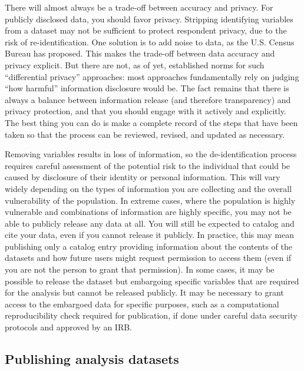 There will almost always be a trade-off between accuracy and privacy.
For publicly disclosed data, you should favor privacy.
Stripping identifying variables from a dataset may not be sufficient to protect respondent privacy,
due to the risk of re-identification.
One solution is to add noise to data, as the U.S. Census Bureau has proposed.
This makes the trade-off between data accuracy and privacy explicit.
But there are not, as of yet, established norms for such ``differential privacy'' approaches:
most approaches fundamentally rely on judging ``how harmful'' information disclosure would be.
The fact remains that there is always a balance between information release (and therefore transparency)
and privacy protection, and that you should engage with it actively and explicitly.
The best thing you can do is make a complete record of the steps that have been taken
so that the process can be reviewed, revised, and updated as necessary.

Removing variables results in loss of information, so the de-identification process
requires careful assessment of the potential risk to the individual
that could be caused by disclosure of their identity or personal information.
This will vary widely depending on the types of information
you are collecting and the overall vulnerability of the population.
In extreme cases, where the population is highly vulnerable
and combinations of information are highly specific,
you may not be able to publicly release any data at all.
You will still be expected to catalog and cite your data,
even if you cannot release it publicly.
In practice, this may mean publishing only a catalog entry
providing information about the contents of the datasets
and how future users might request permission to access them
(even if you are not the person to grant that permission).
In some cases, it may be possible to release the dataset but
embargoing specific variables that are required for the analysis but cannot be released publicly.
It may be necessary to grant access to the embargoed data for specific purposes,
such as a computational reproducibility check required for publication,
if done under careful data security protocols and approved by an IRB.

\subsection{Publishing analysis datasets}


